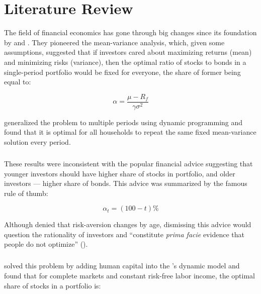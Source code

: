 \chapter{Literature Review} %
\label{litreview} %

The field of financial economics has gone through big changes since its foundation by \citet{markowitz} and \citet{tobin}. They pioneered the mean-variance analysis, which, given some assumptions, suggested that if investors cared about maximizing returns (mean) and minimizing risks (variance), then the optimal ratio of stocks to bonds in a single-period portfolio would be fixed for everyone, the share of former being equal to:

\begin{equation}\label{eq:markowitz}
	\alpha = \frac{\mu - R_f}{\gamma\sigma^2}
\end{equation}

\citet{merton} generalized the problem to multiple periods using dynamic programming and found that it is optimal for all households to repeat the same fixed mean-variance solution every period.

\paragraph{}These results were inconsistent with the popular financial advice suggesting that younger investors should have higher share of stocks in portfolio, and older investors --- higher share of bonds. This advice was summarized by the famous rule of thumb:

\begin{equation}\label{eq:stominus}
	\alpha_t = (100 - t)\%
\end{equation}

Although \citet{samuelson} denied that risk-aversion changes by age, dismissing this advice would question the rationality of investors and ``constitute \textit{prima facie} evidence that people do not optimize'' (\citet{canner}).

\paragraph{}\citet{bodie} solved this problem by adding human capital into the \citet{merton}'s dynamic model and found that for complete markets and constant risk-free labor income, the optimal share of stocks in a portfolio is:


